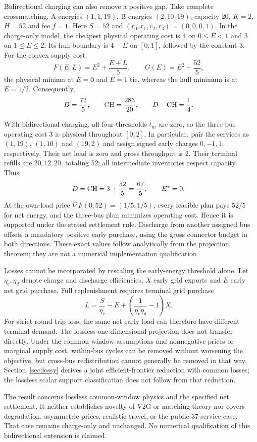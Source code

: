Bidirectional charging can also remove a positive gap. Take complete
crossmatching, A energies $(1,1,19)$, B energies $(2,10,19)$, capacity
20, $K=2$, $H=52$ and fee $f=1$. Here $S=52$ and
$(r_0,r_1,r_2,r_3)=(0,0,0,1)$. In the charge-only model, the cheapest
physical operating cost is 4 on $0\le E<1$ and 3 on $1\le E\le2$.
Its hull boundary is $4-E$ on $[0,1]$, followed by the constant 3.
For the convex supply cost
\[
 F(E,L)=E^2+\frac{E+L}{5},\qquad
 G(E)=E^2+\frac{52}{5},
\]
the physical minima at $E=0$ and $E=1$ tie, whereas the hull minimum
is at $E=1/2$. Consequently,
\[
 D=\frac{72}{5},\qquad \mathrm{CH}=\frac{283}{20},\qquad
 D-\mathrm{CH}=\frac14.
\]

With bidirectional charging, all four thresholds $t_m$ are zero, so the
three-bus operating cost 3 is physical throughout $[0,2]$. In particular,
pair the services as $(1,19)$, $(1,10)$ and $(19,2)$ and assign signed
early charges $0,-1,1$, respectively. Their net load is zero and gross
throughput is 2. Their terminal refills are $20,12,20$, totaling 52;
all intermediate inventories respect capacity. Thus
\[
 D=\mathrm{CH}=3+\frac{52}{5}=\frac{67}{5},\qquad E^*=0.
\]
At the own-load price $\nabla F(0,52)=(1/5,1/5)$, every feasible plan
pays $52/5$ for net energy, and the three-bus plan minimizes operating
cost. Hence it is supported under the stated settlement rule. Discharge
from another assigned bus offsets a mandatory positive early purchase,
using the gross connector budget in both directions. These exact values
follow analytically from the projection theorem; they are not a numerical
implementation qualification.

Losses cannot be incorporated by rescaling the early-energy threshold alone.
Let $\eta_c,\eta_d$ denote charge and discharge efficiencies, $X$ early
grid exports and $E$ early net grid purchase. Full replenishment requires
terminal grid purchase
\[
 L=\frac{S}{\eta_c}-E+
       \left(\frac{1}{\eta_c\eta_d}-1\right)X.
\]
For strict round-trip loss, the same net early load can therefore have
different terminal demand. The lossless one-dimensional projection does
not transfer directly. Under the common-window assumptions and nonnegative
prices or marginal supply cost, within-bus cycles can be removed without
worsening the objective, but cross-bus redistribution cannot generally be
removed in that way. Section~\ref{sec:lossy} derives a joint efficient-frontier
reduction with common losses; the lossless scalar support classification
does not follow from that reduction.

The result concerns lossless common-window physics and the specified net
settlement. It neither establishes novelty of V2G or matching theory nor
covers degradation, asymmetric prices, realistic travel, or the public
37-service case. That case remains charge-only and unchanged. No numerical
qualification of this bidirectional extension is claimed.
